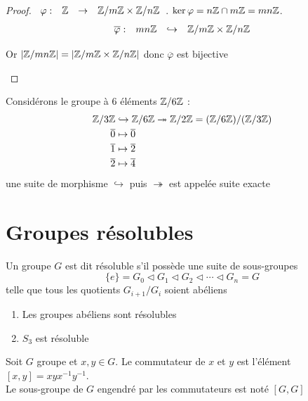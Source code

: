 \documentclass[]{report}
\begin{document}
    \begin{proof}
        $\begin{array}{ccccc} \varphi : & \mathbb{Z} & \to & \mathbb{Z}/m\mathbb{Z}\times\mathbb{Z}/n\mathbb{Z} \end{array}$. $\ker \varphi=n\mathbb{Z}\cap m\mathbb{Z}=mn\mathbb{Z}$.\\
        \[\begin{array}{ccccc} \overline{\varphi} : & mn\mathbb{Z} & \hookrightarrow & \mathbb{Z}/m\mathbb{Z}\times\mathbb{Z}/n\mathbb{Z} \end{array}\]
        \begin{center}
            Or $|\mathbb{Z}/mn\mathbb{Z}|=|\mathbb{Z}/m\mathbb{Z}\times\mathbb{Z}/n\mathbb{Z}|$ donc $\overline{\varphi}$ est bijective
        \end{center}
    \end{proof}

    \begin{ex}{}{}
        Considérons le groupe à 6 éléments $\mathbb{Z}/6\mathbb{Z}$ :
        \begin{align*}
            \mathbb{Z}/3\mathbb{Z}&\hookrightarrow\mathbb{Z}/6\mathbb{Z}\twoheadrightarrow \mathbb{Z}/2\mathbb{Z}=(\mathbb{Z}/6\mathbb{Z})/(\mathbb{Z}/3\mathbb{Z})\\
            \overline{0}&\mapsto\overline{0}\\
            \overline{1}&\mapsto\overline{2}\\
            \overline{2}&\mapsto\overline{4}
        \end{align*}
        une suite de morphisme $\hookrightarrow$ puis $\twoheadrightarrow$ est appelée suite exacte
    \end{ex}

    \section{Groupes résolubles}

    \begin{df}{}{}
        Un groupe $G$ est dit résoluble s'il possède une suite de sous-groupes 
        \[\{e\}=G_0\triangleleft G_1\triangleleft G_2\triangleleft\cdots\triangleleft G_n=G\]
        telle que tous les quotients $G_{i+1}/G_i$ soient abéliens
    \end{df}

    \begin{ex}{}{}
        \begin{enumerate}
            \item Les groupes abéliens sont résolubles
            \item $S_3$ est résoluble
        \end{enumerate}
    \end{ex}

    \begin{df}{}{}
        Soit $G$ groupe et $x,y\in G$. Le commutateur de $x$ et $y$ est l'élément $[x,y]=xyx^{-1}y^{-1}$.\\
        Le sous-groupe de $G$ engendré par les commutateurs est noté $[G,G]$ 
    \end{df}
\end{document}
